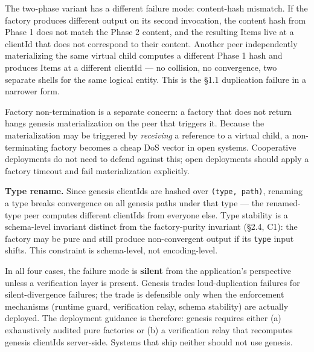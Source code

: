 The two-phase variant has a different failure mode: content-hash mismatch. If the factory produces different output on its second invocation, the content hash from Phase 1 does not match the Phase 2 content, and the resulting Items live at a clientId that does not correspond to their content. Another peer independently materializing the same virtual child computes a different Phase 1 hash and produces Items at a different clientId --- no collision, no convergence, two separate shells for the same logical entity. This is the \S1.1 duplication failure in a narrower form.

Factory non-termination is a separate concern: a factory that does not return hangs genesis materialization on the peer that triggers it. Because the materialization may be triggered by \emph{receiving} a reference to a virtual child, a non-terminating factory becomes a cheap DoS vector in open systems. Cooperative deployments do not need to defend against this; open deployments should apply a factory timeout and fail materialization explicitly.

\textbf{Type rename.} Since genesis clientIds are hashed over \texttt{(type, path)}, renaming a type breaks convergence on all genesis paths under that type --- the renamed-type peer computes different clientIds from everyone else. Type stability is a schema-level invariant distinct from the factory-purity invariant (\S2.4, C1): the factory may be pure and still produce non-convergent output if its \texttt{type} input shifts. This constraint is schema-level, not encoding-level.

In all four cases, the failure mode is \textbf{silent} from the application's perspective unless a verification layer is present. Genesis trades loud-duplication failures for silent-divergence failures; the trade is defensible only when the enforcement mechanisms (runtime guard, verification relay, schema stability) are actually deployed. The deployment guidance is therefore: genesis requires either (a) exhaustively audited pure factories or (b) a verification relay that recomputes genesis clientIds server-side. Systems that ship neither should not use genesis.

